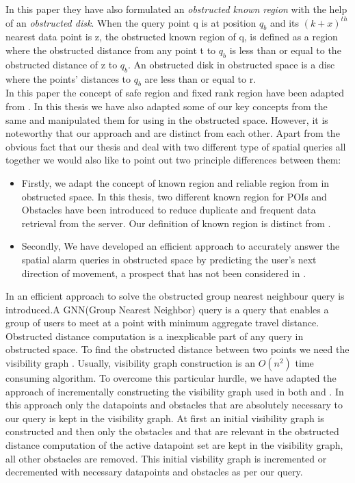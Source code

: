In this paper they have also formulated an \textit{obstructed known region} with the help of an \textit{obstructed disk}. When the query point q is at position $q_{b}$ and its $(k+x)^{th}$ nearest data point is z, the obstructed known region of q, is defined as a region where the obstructed distance from any point t to $q_b$ is less than or equal to the obstructed distance of z to $q_{b}$. An obstructed disk in obstructed space is a disc where the points’ distances to $q_b$ are less than or equal to r. \\

In this paper the concept of safe region and fixed rank region have been adapted from \cite{mknn}. In this thesis we have also adapted some of our key concepts from the same and manipulated them for using in the obstructed space. However, it is noteworthy that our approach and \cite{oknn} are distinct from each other. Apart from the obvious fact that our thesis and \cite{oknn} deal with two different type of spatial queries all together we would also like to point out two principle differences between them:
\begin{itemize}
\item Firstly, we adapt the concept of known region and reliable region from \cite{mknn} in obstructed space. In this thesis, two different known region for POIs and Obstacles have been introduced to reduce duplicate and frequent data retrieval from the server. Our definition of known region is distinct from \cite{oknn}.
\item Secondly, We have developed an efficient approach to accurately answer the spatial alarm queries in obstructed space by predicting the user's next direction of movement, a prospect that has not been considered in \cite{oknn}.  
\end{itemize}
\vspace{5pt}
In \cite{ognn} an efficient approach to solve the obstructed group nearest neighbour query is introduced.A GNN(Group Nearest Neighbor) query is a query that enables a group of users to meet at a point with minimum aggregate travel distance.   
   \vspace{5pt}
Obstructed distance computation is a inexplicable part of any query in obstructed space. To find the obstructed distance between two points we need the visibility graph \cite{ognn}. Usually, visibility graph construction is an $ O(n^2) $ time consuming algorithm. To overcome this particular hurdle, we have adapted the approach of incrementally constructing the visibility graph used in both \cite{ognn} and \cite{oknn}. In this approach only the datapoints and obstacles that are absolutely necessary to our query is kept in the visibility graph. At first an initial visibility graph is constructed and then only the obstacles and that are relevant in the obstructed distance computation of the active datapoint set are kept in the visibility graph, all other obstacles are removed. This initial visbility graph is incremented or decremented with necessary datapoints and obstacles as per our query. 
\vspace{10pt}




